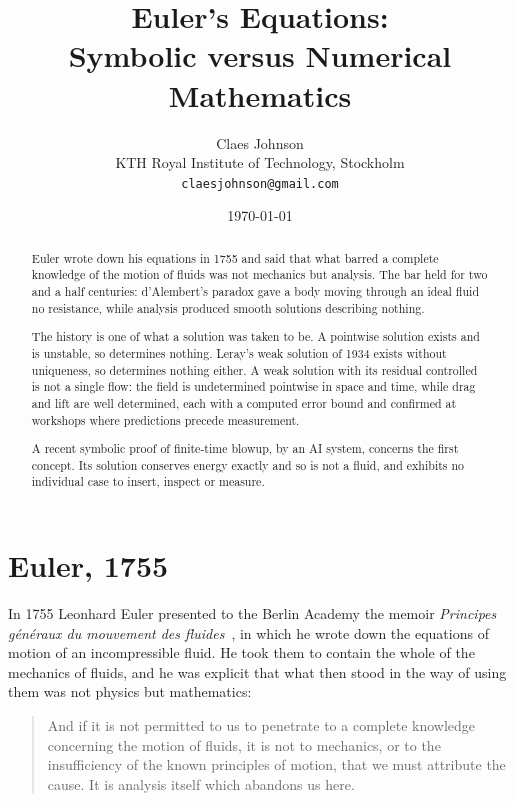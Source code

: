 \documentclass[11pt]{article}
\title{\vspace{-2em}Euler's Equations:\\Symbolic versus Numerical Mathematics}
\author{Claes Johnson\\[0.4em]
\small KTH Royal Institute of Technology, Stockholm\\
\small \texttt{claesjohnson@gmail.com}}
\date{\today}
\begin{document}
\maketitle

\begin{abstract}
\noindent
Euler wrote down his equations in 1755 and said that what barred a complete knowledge of the motion
of fluids was not mechanics but analysis. The bar held for two and a half centuries: d'Alembert's
paradox gave a body moving through an ideal fluid no resistance, while analysis produced smooth
solutions describing nothing.

The history is one of what a solution was taken to be. A pointwise solution exists and is unstable,
so determines nothing. Leray's weak solution of 1934 exists without uniqueness, so determines nothing
either. A weak solution with its residual controlled is not a single flow: the field is undetermined
pointwise in space and time, while drag and lift are well determined, each with a computed error
bound and confirmed at workshops where predictions precede measurement.

A recent symbolic proof of finite-time blowup, by an AI system, concerns the first concept. Its
solution conserves energy exactly and so is not a fluid, and exhibits no individual case to insert,
inspect or measure.
\end{abstract}

\section{Euler, 1755}\label{sec:eq}

In 1755 Leonhard Euler presented to the Berlin Academy the memoir \emph{Principes g\'en\'eraux du
mouvement des fluides}~\cite{euler1755}, in which he wrote down the equations of motion of an
incompressible fluid. He took them to contain the whole of the mechanics of fluids, and he was
explicit that what then stood in the way of using them was not physics but mathematics:

\begin{quote}\small
And if it is not permitted to us to penetrate to a complete knowledge concerning the motion of
fluids, it is not to mechanics, or to the insufficiency of the known principles of motion, that we
must attribute the cause. It is analysis itself which abandons us here.
\end{quote}
\end{document}
